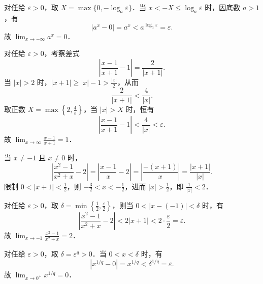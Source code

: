 \begin{myproof}

    对任给 $\varepsilon > 0$，取 $X = \max\{0, -\log_a \varepsilon\}$．当 $x < -X \leqslant \log_a \varepsilon$ 时，因底数 $a > 1$，有
    \begin{equation}
        |a^x - 0| = a^x < a^{\log_a \varepsilon} = \varepsilon.
    \end{equation}
    故 $\lim_{x\to -\infty} a^x = 0$．


    对任给 $\varepsilon > 0$，考察差式
    \begin{equation}
        \left| \frac{x-1}{x+1} - 1 \right| = \frac{2}{|x+1|}.
    \end{equation}
    当 $|x| > 2$ 时，$|x+1| \geqslant |x| - 1 > \frac{|x|}{2}$，从而
    \begin{equation}
        \frac{2}{|x+1|} < \frac{4}{|x|}.
    \end{equation}
    取正数 $X = \max\left\{ 2, \frac{4}{\varepsilon} \right\}$，当 $|x| > X$ 时，恒有
    \begin{equation}
        \left| \frac{x-1}{x+1} - 1 \right| < \frac{4}{|x|} < \varepsilon.
    \end{equation}
    故 $\lim_{x\to\infty} \frac{x-1}{x+1} = 1$．


    当 $x \neq -1$ 且 $x \neq 0$ 时，
    \begin{equation}
        \left| \frac{x^2-1}{x^2+x} - 2 \right| = \left| \frac{x-1}{x} - 2 \right| = \left| \frac{-(x+1)}{x} \right| = \frac{|x+1|}{|x|}.
    \end{equation}
    限制 $0 < |x+1| < \frac{1}{2}$，则 $-\frac{3}{2} < x < -\frac{1}{2}$，进而 $|x| > \frac{1}{2}$，即 $\frac{1}{|x|} < 2$．

    对任给 $\varepsilon > 0$，取 $\delta = \min\left\{ \frac{1}{2}, \frac{\varepsilon}{2} \right\}$，则当 $0 < |x - (-1)| < \delta$ 时，有
    \begin{equation}
        \left| \frac{x^2-1}{x^2+x} - 2 \right| < 2|x+1| < 2 \cdot \frac{\varepsilon}{2} = \varepsilon.
    \end{equation}
    故 $\lim_{x\to -1} \frac{x^2-1}{x^2+x} = 2$．


    对任给 $\varepsilon > 0$，取 $\delta = \varepsilon^q > 0$．当 $0 < x < \delta$ 时，有
    \begin{equation}
        \left| x^{1/q} - 0 \right| = x^{1/q} < \delta^{1/q} = \varepsilon.
    \end{equation}
    故 $\lim_{x\to 0^+} x^{1/q} = 0$．
\end{myproof}

